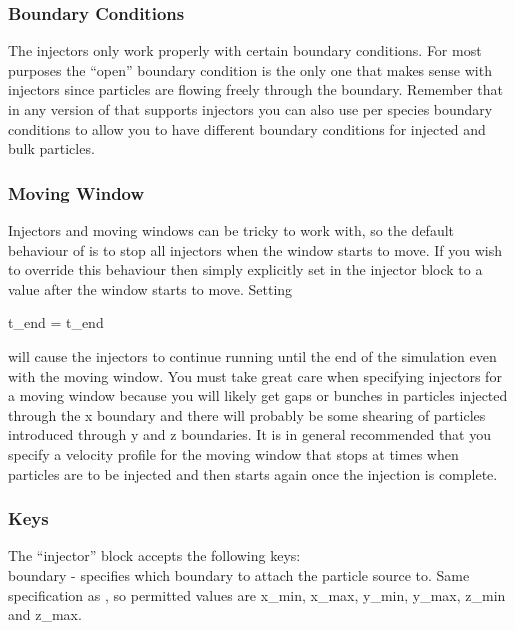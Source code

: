 \subsubsection{Boundary Conditions}

The injectors only work properly with certain boundary conditions. For most
purposes the ``open'' boundary condition is the only one that makes sense with
injectors since particles are flowing freely through the boundary. Remember
that in any version of {\EPOCH} that supports injectors you can also use per
species boundary conditions to allow you to have different boundary conditions
for injected and bulk particles.

\subsubsection{Moving Window}

Injectors and moving windows can be tricky to work with, so the default
behaviour of {\EPOCH} is to stop all injectors when the window starts to move.
If you wish to override this behaviour then simply explicitly set
 in the injector block to a value after the window starts
to move. Setting
\begin{boxverbatim}
t_end = t_end
\end{boxverbatim}
will cause the injectors to continue running until the end of the simulation
even with the moving window. You must take great care when specifying injectors
for a moving window because you will likely get gaps or bunches in particles
injected through the x boundary and there will probably be some shearing of
particles introduced through y and z boundaries. It is in general recommended
that you specify a velocity profile for the moving window that stops at times
when particles are to be injected and then starts again once the injection is
complete.

\subsubsection{Keys}

The ``injector'' block accepts the following keys:\\

{\emphtext boundary} - specifies which boundary to attach the particle source
  to. Same specification as , so permitted values are
  x\_min, x\_max, y\_min, y\_max, z\_min and z\_max.\\

